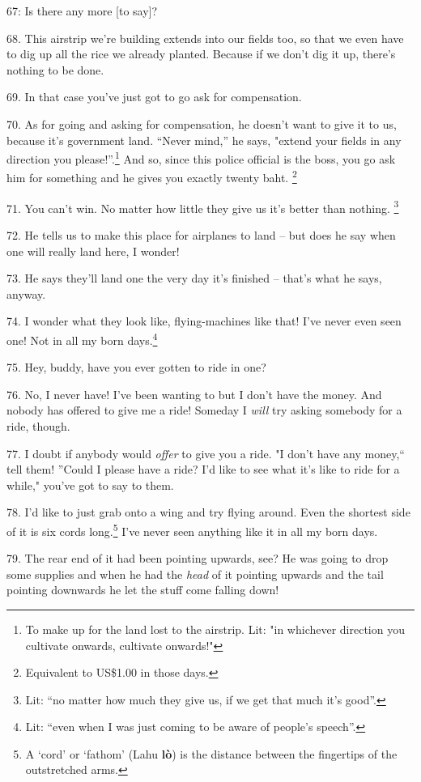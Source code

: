  67: Is there any more [to say]?

68. This airstrip we're building extends into our fields too, so that we even have
to dig up all the rice we already planted. Because if we don't dig it up, there's
nothing to be done.

69. In that case you've just got to go ask for compensation.

70. As for going and asking for compensation, he doesn't want to give it to us,
because it's government land. ``Never mind,'' he says, "extend
your fields in any direction you please!''.\footnote{To make up for the land lost to the airstrip. Lit: "in whichever direction you cultivate onwards, cultivate onwards!"} And so, since this police official
is the boss, you go ask him for something and he gives you exactly twenty baht.
\footnote{Equivalent to US\$1.00 in those days.}

71. You can't win. No matter how little they give us it's better than nothing.
\footnote{Lit: ``no matter how much they give us, if we get that much it's good''.}

72. He tells us to make this place for airplanes to land -- but does he say when
one will really land here, I wonder!

73. He says they'll land one the very day it's finished -- that's what he says,
anyway.

74. I wonder what they look like, flying-machines like that! I've never even seen
one! Not in all my born days.\footnote{Lit: ``even when I was just coming to be aware of people's speech''.}

75. Hey, buddy, have you ever gotten to ride in one?

76. No, I never have! I've been wanting to but I don't have the money. And nobody
has offered to give me a ride! Someday I \textit{will} try asking somebody for
a ride, though.

77. I doubt if anybody would \textit{offer} to give you a ride. "I don't
have any money,`` tell them! ''Could I please have a ride? I'd
like to see what it's like to ride for a while," you've got to say to
them.

78. I'd like to just grab onto a wing and try flying around. Even the shortest
side of it is six cords long.\footnote{A `cord' or `fathom' (Lahu \textbf{lò}) is the distance between the fingertips of the outstretched arms.} I've never seen anything like it in all my born
days.

79. The rear end of it had been pointing upwards, see? He was going to drop some
supplies and when he had the \textit{head} of it pointing upwards and the tail
pointing downwards he let the stuff come falling down!

